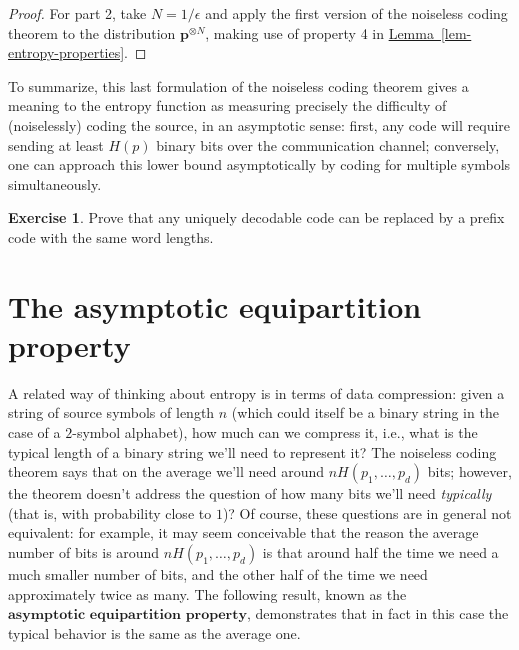 \documentclass[11pt]{report}
\theoremstyle{plain}
\theoremstyle{definition}
\newtheorem{xexercise}[thm]{Exercise}
\begin{document}
\begin{proof}
For part 2, take $N=1/\epsilon$ and apply the first
version of the noiseless coding theorem to the
distribution $\mathbf{p}^{\otimes N}$, making use of
property 4 in \hyperref[lem-entropy-properties]{Lemma~\ref*{lem-entropy-properties}}.
\end{proof}

\noindent To summarize, this last formulation of the noiseless
coding theorem gives a meaning to the entropy function
as measuring precisely the difficulty of (noiselessly)
coding the source, in an asymptotic sense: first, any
code will require sending at least $H(p)$ binary bits
over the communication channel; conversely, one can
approach this lower bound asymptotically by coding for
multiple symbols simultaneously.

\begin{xexercise}
\label{exer-uniquely-decodable}
Prove that any uniquely decodable code can be
replaced by a prefix code with the same word lengths.
\end{xexercise}

\section{The asymptotic equipartition property}

A related way of thinking about entropy is in terms
of data compression: given a string of source symbols
of length $n$ (which could itself be a binary string
in the case of a $2$-symbol alphabet), how much can
we compress it, i.e., what is the typical length of a
binary string we'll need to represent it? The
noiseless coding theorem says that on the average
we'll need around $n H(p_1,\ldots,p_d)$ bits;
however, the theorem doesn't address the question of
how many bits we'll need \emph{typically} (that is, with
probability close to $1$)? Of course, these questions
are in general not equivalent: for example, it may
seem conceivable that the reason the average number of
bits is around $nH(p_1,\ldots,p_d)$ is that around
half the time we need a much smaller number of bits,
and the other half of the time we need approximately
twice as many. The following result, known as the
$\textbf{asymptotic equipartition property}$,
demonstrates that in fact in this case the typical
behavior is the same as the average one.
\end{document}
